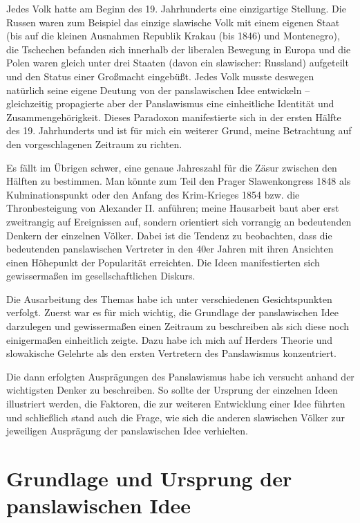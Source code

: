 \documentclass[12pt,headsepline,a4paper]{scrartcl}
\begin{document}
Jedes Volk hatte am Beginn des 19. Jahrhunderts eine einzigartige Stellung. Die Russen waren
zum Beispiel das einzige slawische Volk mit einem eigenen Staat (bis auf die kleinen
Ausnahmen Republik Krakau (bis 1846) und Montenegro), die Tschechen befanden sich innerhalb der liberalen
Bewegung in Europa und die Polen waren gleich unter drei Staaten (davon ein slawischer:
Russland) aufgeteilt und den Status einer Großmacht eingebüßt. Jedes Volk
musste deswegen natürlich seine eigene Deutung von der panslawischen Idee entwickeln –
gleichzeitig
propagierte
aber
der
Panslawismus
eine
einheitliche
Identität
und
Zusammengehörigkeit. Dieses Paradoxon manifestierte sich in der ersten Hälfte des 19.
Jahrhunderts und ist für mich ein weiterer Grund, meine Betrachtung auf den vorgeschlagenen
Zeitraum zu richten.

Es fällt im Übrigen schwer, eine genaue Jahreszahl für die Zäsur zwischen den Hälften zu
bestimmen. Man könnte zum Teil den Prager Slawenkongress 1848 als Kulminationspunkt oder den Anfang des
Krim-Krieges 1854 bzw. die Thronbesteigung von Alexander II. anführen; meine Hausarbeit
baut aber erst zweitrangig auf Ereignissen auf, sondern orientiert sich vorrangig an
bedeutenden Denkern der einzelnen Völker. Dabei ist die Tendenz zu beobachten, dass die
bedeutenden panslawischen Vertreter in den 40er Jahren mit ihren Ansichten einen Höhepunkt
der Popularität erreichten. Die Ideen manifestierten sich gewissermaßen im gesellschaftlichen
Diskurs.

Die Ausarbeitung des Themas habe ich unter verschiedenen Gesichtspunkten verfolgt. Zuerst
war es für mich wichtig, die Grundlage der panslawischen Idee darzulegen und
gewissermaßen einen Zeitraum zu beschreiben als sich diese noch einigermaßen einheitlich
zeigte. Dazu habe ich mich auf Herders Theorie und slowakische Gelehrte als den ersten
Vertretern des Panslawismus konzentriert.

Die dann erfolgten Ausprägungen des Panslawismus habe ich versucht anhand der wichtigsten
Denker zu beschreiben. So sollte der Ursprung der einzelnen Ideen illustriert werden, die
Faktoren, die zur weiteren Entwicklung einer Idee führten und schließlich stand auch die
Frage, wie sich die anderen slawischen Völker zur jeweiligen Ausprägung der panslawischen
Idee verhielten.

\newpage
\section{Grundlage und Ursprung der panslawischen Idee}
\end{document}

